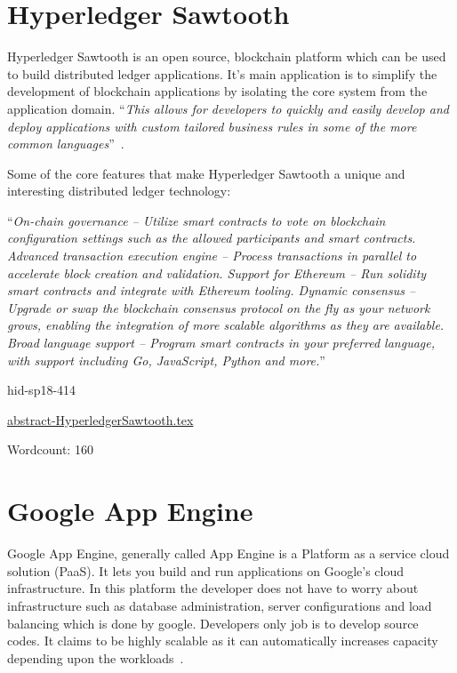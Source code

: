 \section{Hyperledger Sawtooth}

Hyperledger Sawtooth is an open source, blockchain platform which can
be used to build distributed ledger applications. It’s main
application is to simplify the development of blockchain applications
by isolating the core system from the application domain. \color{blue}``\emph{This
allows for developers to quickly and easily develop and deploy
applications with custom tailored business rules in some of the more
common languages}''\color{black}~\cite{hid-sp18-414-Hyperledger_Sawtooth}.

Some of the core features that make Hyperledger Sawtooth a unique and
interesting distributed ledger technology:
  
\color{blue}``\emph{On-chain governance – Utilize smart contracts to vote on blockchain
configuration settings such as the allowed participants and smart
contracts.  Advanced transaction execution engine – Process
transactions in parallel to accelerate block creation and validation.
Support for Ethereum – Run solidity smart contracts and integrate with
Ethereum tooling.  Dynamic consensus – Upgrade or swap the blockchain
consensus protocol on the fly as your network grows, enabling the
integration of more scalable algorithms as they are available.  Broad
language support – Program smart contracts in your preferred language,
with support including Go, JavaScript, Python and 
more.}''\color{black}~\cite{hid-sp18-414-Linux_Foundation_Sawtooth}


\begin{IU}

hid-sp18-414

\href{https://github.com/cloudmesh-community/hid-sp18-414/blob/master//technology/abstract-HyperledgerSawtooth.tex}{abstract-HyperledgerSawtooth.tex}

 

Wordcount: 160

\end{IU}

\section{Google App Engine}

Google App Engine, generally called App Engine is a Platform as a service cloud 
solution (PaaS). It lets you build and run applications on Google’s cloud 
infrastructure. In this platform the developer does not have to worry about 
infrastructure such as database administration, server configurations and 
load balancing which is done by google. Developers only job is to develop 
source codes.  It claims to be highly scalable as it can automatically 
increases capacity depending upon the
workloads~\cite{hid-sp18-415-www-scalabitity}.
 
